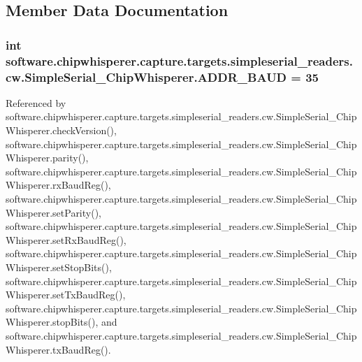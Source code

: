 \subsection{Member Data Documentation}
\hypertarget{classsoftware_1_1chipwhisperer_1_1capture_1_1targets_1_1simpleserial__readers_1_1cw_1_1SimpleSerial__ChipWhisperer_adbc80aae924a46ce425d4d3e5361fb96}{}
\subsubsection[{A\+D\+D\+R\+\_\+\+B\+A\+U\+D}]{\setlength{\rightskip}{0pt plus 5cm}int software.\+chipwhisperer.\+capture.\+targets.\+simpleserial\+\_\+readers.\+cw.\+Simple\+Serial\+\_\+\+Chip\+Whisperer.\+A\+D\+D\+R\+\_\+\+B\+A\+U\+D = 35\hspace{0.3cm}{\ttfamily [static]}}\label{classsoftware_1_1chipwhisperer_1_1capture_1_1targets_1_1simpleserial__readers_1_1cw_1_1SimpleSerial__ChipWhisperer_adbc80aae924a46ce425d4d3e5361fb96}


Referenced by software.\+chipwhisperer.\+capture.\+targets.\+simpleserial\+\_\+readers.\+cw.\+Simple\+Serial\+\_\+\+Chip\+Whisperer.\+check\+Version(), software.\+chipwhisperer.\+capture.\+targets.\+simpleserial\+\_\+readers.\+cw.\+Simple\+Serial\+\_\+\+Chip\+Whisperer.\+parity(), software.\+chipwhisperer.\+capture.\+targets.\+simpleserial\+\_\+readers.\+cw.\+Simple\+Serial\+\_\+\+Chip\+Whisperer.\+rx\+Baud\+Reg(), software.\+chipwhisperer.\+capture.\+targets.\+simpleserial\+\_\+readers.\+cw.\+Simple\+Serial\+\_\+\+Chip\+Whisperer.\+set\+Parity(), software.\+chipwhisperer.\+capture.\+targets.\+simpleserial\+\_\+readers.\+cw.\+Simple\+Serial\+\_\+\+Chip\+Whisperer.\+set\+Rx\+Baud\+Reg(), software.\+chipwhisperer.\+capture.\+targets.\+simpleserial\+\_\+readers.\+cw.\+Simple\+Serial\+\_\+\+Chip\+Whisperer.\+set\+Stop\+Bits(), software.\+chipwhisperer.\+capture.\+targets.\+simpleserial\+\_\+readers.\+cw.\+Simple\+Serial\+\_\+\+Chip\+Whisperer.\+set\+Tx\+Baud\+Reg(), software.\+chipwhisperer.\+capture.\+targets.\+simpleserial\+\_\+readers.\+cw.\+Simple\+Serial\+\_\+\+Chip\+Whisperer.\+stop\+Bits(), and software.\+chipwhisperer.\+capture.\+targets.\+simpleserial\+\_\+readers.\+cw.\+Simple\+Serial\+\_\+\+Chip\+Whisperer.\+tx\+Baud\+Reg().

